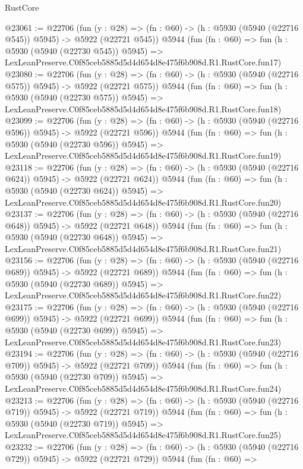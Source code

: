 \begin{lexlean}{RustCore}
\begin{coremodule}
@23061 := @22706
    (fun (y : @28) => (fn : @60) -> (h : @5930 (@5940 (@22716 @545)) @5945) -> @5922 (@22721 @545))
    @5944
    (fun (fn : @60) =>
    fun (h : @5930 (@5940 (@22730 @545)) @5945) =>
    LexLeanPreserve.C0f85ceb5885d5d4d654d8e475f6b908d.R1.RustCore.fun17)
@23080 := @22706
    (fun (y : @28) => (fn : @60) -> (h : @5930 (@5940 (@22716 @575)) @5945) -> @5922 (@22721 @575))
    @5944
    (fun (fn : @60) =>
    fun (h : @5930 (@5940 (@22730 @575)) @5945) =>
    LexLeanPreserve.C0f85ceb5885d5d4d654d8e475f6b908d.R1.RustCore.fun18)
@23099 := @22706
    (fun (y : @28) => (fn : @60) -> (h : @5930 (@5940 (@22716 @596)) @5945) -> @5922 (@22721 @596))
    @5944
    (fun (fn : @60) =>
    fun (h : @5930 (@5940 (@22730 @596)) @5945) =>
    LexLeanPreserve.C0f85ceb5885d5d4d654d8e475f6b908d.R1.RustCore.fun19)
@23118 := @22706
    (fun (y : @28) => (fn : @60) -> (h : @5930 (@5940 (@22716 @624)) @5945) -> @5922 (@22721 @624))
    @5944
    (fun (fn : @60) =>
    fun (h : @5930 (@5940 (@22730 @624)) @5945) =>
    LexLeanPreserve.C0f85ceb5885d5d4d654d8e475f6b908d.R1.RustCore.fun20)
@23137 := @22706
    (fun (y : @28) => (fn : @60) -> (h : @5930 (@5940 (@22716 @648)) @5945) -> @5922 (@22721 @648))
    @5944
    (fun (fn : @60) =>
    fun (h : @5930 (@5940 (@22730 @648)) @5945) =>
    LexLeanPreserve.C0f85ceb5885d5d4d654d8e475f6b908d.R1.RustCore.fun21)
@23156 := @22706
    (fun (y : @28) => (fn : @60) -> (h : @5930 (@5940 (@22716 @689)) @5945) -> @5922 (@22721 @689))
    @5944
    (fun (fn : @60) =>
    fun (h : @5930 (@5940 (@22730 @689)) @5945) =>
    LexLeanPreserve.C0f85ceb5885d5d4d654d8e475f6b908d.R1.RustCore.fun22)
@23175 := @22706
    (fun (y : @28) => (fn : @60) -> (h : @5930 (@5940 (@22716 @699)) @5945) -> @5922 (@22721 @699))
    @5944
    (fun (fn : @60) =>
    fun (h : @5930 (@5940 (@22730 @699)) @5945) =>
    LexLeanPreserve.C0f85ceb5885d5d4d654d8e475f6b908d.R1.RustCore.fun23)
@23194 := @22706
    (fun (y : @28) => (fn : @60) -> (h : @5930 (@5940 (@22716 @709)) @5945) -> @5922 (@22721 @709))
    @5944
    (fun (fn : @60) =>
    fun (h : @5930 (@5940 (@22730 @709)) @5945) =>
    LexLeanPreserve.C0f85ceb5885d5d4d654d8e475f6b908d.R1.RustCore.fun24)
@23213 := @22706
    (fun (y : @28) => (fn : @60) -> (h : @5930 (@5940 (@22716 @719)) @5945) -> @5922 (@22721 @719))
    @5944
    (fun (fn : @60) =>
    fun (h : @5930 (@5940 (@22730 @719)) @5945) =>
    LexLeanPreserve.C0f85ceb5885d5d4d654d8e475f6b908d.R1.RustCore.fun25)
@23232 := @22706
    (fun (y : @28) => (fn : @60) -> (h : @5930 (@5940 (@22716 @729)) @5945) -> @5922 (@22721 @729))
    @5944
    (fun (fn : @60) =>

\end{coremodule}
\end{lexlean}
